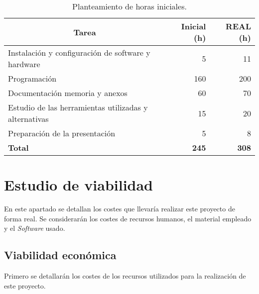 \begin{table}[]
	\label{horas}
	\centering
	\begin{tabular}{|l|r|r|}
		\hline
		\multicolumn{1}{|c|}{\textbf{Tarea}}     & \textbf{Inicial (h)} & \textbf{REAL (h)} \\ \hline
		Instalación y configuración de software y hardware & 5  & 11   \\ \hline
		Programación                            & 160   & 200        \\ \hline
		Documentación memoria y anexos          & 60    & 70      \\ \hline
		Estudio de las herramientas utilizadas y alternativas & 15  & 20  \\ \hline
		Preparación de la presentación		    & 5    & 8         \\ \hline
		\textbf{Total}		    &   \textbf{245} &  \textbf{308}        \\ \hline
	\end{tabular}
	\caption{Planteamiento de horas iniciales.}
\end{table}


\section{Estudio de viabilidad}
En este apartado se detallan los costes que llevaría realizar este proyecto de forma real. Se considerarán los costes de recursos humanos, el material empleado y el \emph{Software} usado. 

\subsection{Viabilidad económica}
Primero se detallarán los costes de los recursos utilizados para la realización de este proyecto.

